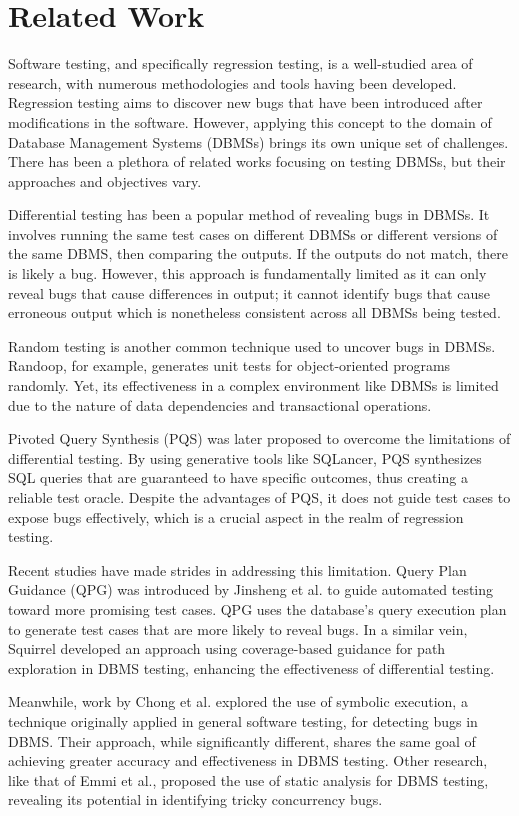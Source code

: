 \documentclass[sigconf]{acmart}
\begin{document}
\section{Related Work}

Software testing, and specifically regression testing, is a well-studied area of research, with numerous methodologies and tools having been developed. Regression testing aims to discover new bugs that have been introduced after modifications in the software. However, applying this concept to the domain of Database Management Systems (DBMSs) brings its own unique set of challenges. There has been a plethora of related works focusing on testing DBMSs, but their approaches and objectives vary.

Differential testing has been a popular method of revealing bugs in DBMSs. It involves running the same test cases on different DBMSs or different versions of the same DBMS, then comparing the outputs. If the outputs do not match, there is likely a bug. However, this approach is fundamentally limited as it can only reveal bugs that cause differences in output; it cannot identify bugs that cause erroneous output which is nonetheless consistent across all DBMSs being tested.

Random testing is another common technique used to uncover bugs in DBMSs. Randoop, for example, generates unit tests for object-oriented programs randomly. Yet, its effectiveness in a complex environment like DBMSs is limited due to the nature of data dependencies and transactional operations.

Pivoted Query Synthesis (PQS) was later proposed to overcome the limitations of differential testing. By using generative tools like SQLancer, PQS synthesizes SQL queries that are guaranteed to have specific outcomes, thus creating a reliable test oracle. Despite the advantages of PQS, it does not guide test cases to expose bugs effectively, which is a crucial aspect in the realm of regression testing.

Recent studies have made strides in addressing this limitation. Query Plan Guidance (QPG) was introduced by Jinsheng et al. to guide automated testing toward more promising test cases. QPG uses the database's query execution plan to generate test cases that are more likely to reveal bugs. In a similar vein, Squirrel developed an approach using coverage-based guidance for path exploration in DBMS testing, enhancing the effectiveness of differential testing.

Meanwhile, work by Chong et al.  explored the use of symbolic execution, a technique originally applied in general software testing, for detecting bugs in DBMS. Their approach, while significantly different, shares the same goal of achieving greater accuracy and effectiveness in DBMS testing. Other research, like that of Emmi et al., proposed the use of static analysis for DBMS testing, revealing its potential in identifying tricky concurrency bugs.
\end{document}
